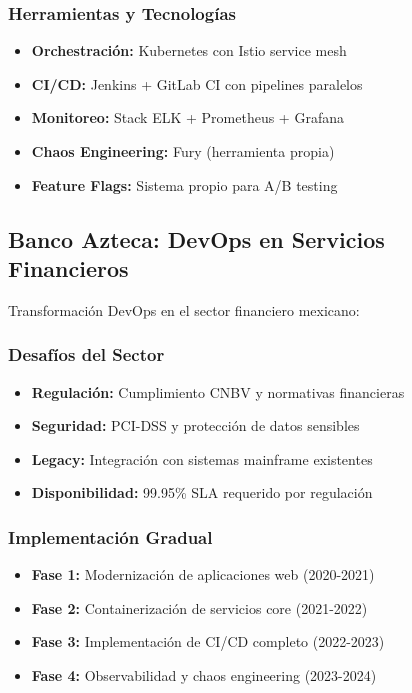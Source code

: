 \documentclass[12pt,a4paper]{article}
\begin{document}
\subsubsection{Herramientas y Tecnologías}
\begin{itemize}
    \item \textbf{Orchestración:} Kubernetes con Istio service mesh
    \item \textbf{CI/CD:} Jenkins + GitLab CI con pipelines paralelos
    \item \textbf{Monitoreo:} Stack ELK + Prometheus + Grafana
    \item \textbf{Chaos Engineering:} Fury (herramienta propia)
    \item \textbf{Feature Flags:} Sistema propio para A/B testing
\end{itemize}

\subsection{Banco Azteca: DevOps en Servicios Financieros}
Transformación DevOps en el sector financiero mexicano:

\subsubsection{Desafíos del Sector}
\begin{itemize}
    \item \textbf{Regulación:} Cumplimiento CNBV y normativas financieras
    \item \textbf{Seguridad:} PCI-DSS y protección de datos sensibles
    \item \textbf{Legacy:} Integración con sistemas mainframe existentes
    \item \textbf{Disponibilidad:} 99.95\% SLA requerido por regulación
\end{itemize}

\subsubsection{Implementación Gradual}
\begin{itemize}
    \item \textbf{Fase 1:} Modernización de aplicaciones web (2020-2021)
    \item \textbf{Fase 2:} Containerización de servicios core (2021-2022)
    \item \textbf{Fase 3:} Implementación de CI/CD completo (2022-2023)
    \item \textbf{Fase 4:} Observabilidad y chaos engineering (2023-2024)
\end{itemize}
\end{document}
